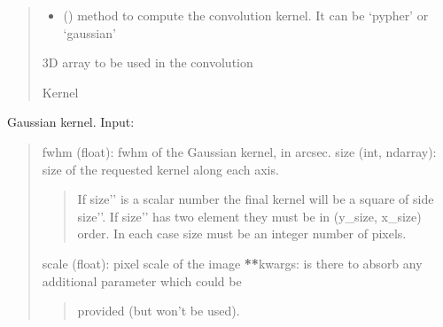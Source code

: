 \documentclass[letterpaper,10pt,english]{sphinxmanual}
\begin{document}
\begin{fulllineitems}
\begin{quote}
\begin{description}
\begin{itemize}
\item {} 
\sphinxAtStartPar
{} () \textendash{} method to compute the convolution kernel.
It can be ‘pypher’ or ‘gaussian’

\end{itemize}

\sphinxAtStartPar
\begin{description}
\sphinxAtStartPar
3D array to be used in the convolution

\end{description}


\sphinxAtStartPar
Kernel

\end{description}\end{quote}

\end{fulllineitems}


\begin{fulllineitems}
\label{\detokenize{api/pymusepipe:pymusepipe.cube_convolve.gaussian_kernel}}
\pysigstartsignatures
{}
\pysigstopsignatures
\sphinxAtStartPar
Gaussian kernel.
Input:
\begin{quote}

\sphinxAtStartPar
fwhm (float): fwhm of the Gaussian kernel, in arcsec.
size (int, ndarray): size of the requested kernel along each axis.
\begin{quote}

\sphinxAtStartPar
If {\color{red}\bfseries{}\textasciigrave{}\textasciigrave{}}size’’ is a scalar number the final kernel will be a square of
side {\color{red}\bfseries{}\textasciigrave{}\textasciigrave{}}size’’. If {\color{red}\bfseries{}\textasciigrave{}\textasciigrave{}}size’’ has two element they must be in
(y\_size, x\_size) order. In each case size must be an integer number
of pixels.
\end{quote}

\sphinxAtStartPar
scale (float): pixel scale of the image
{\color{red}\bfseries{}**}kwargs: is there to absorb any additional parameter which could be
\begin{quote}

\sphinxAtStartPar
provided (but won’t be used).
\end{quote}
\end{quote}

\end{fulllineitems}
\end{document}
